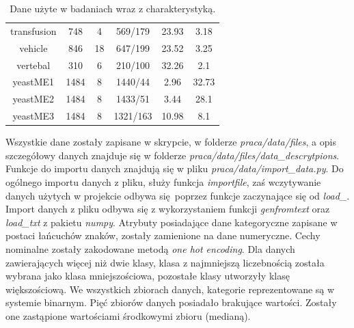 \begin{table}[H]
\begin{center}
{\begin{tabular}{|c|c|c|c|c|c|}
				transfusion&748&4&569/179&23.93&3.18\\%
				vehicle&846&18&647/199&23.52&3.25\\%
				vertebal&310&6&210/100&32.26&2.1\\%
				yeastME1&1484&8&1440/44&2.96&32.73\\%
				yeastME2&1484&8&1433/51&3.44&28.1\\%
				yeastME3&1484&8&1321/163&10.98&8.1\\%
				\hline%
			\end{tabular}}
			\caption{Dane użyte w badaniach wraz z charakterystyką.}
			\label{danebadania}
		\end{center}
	\end{table}
Wszystkie dane zostały zapisane w skrypcie, w folderze \textit{praca/data/files}, a opis szczegółowy danych znajduje się w folderze \textit{praca/data/files/data\_descrytpions}. Funkcje do importu danych znajdują się w pliku \textit{praca/data/import\_data.py}. Do ogólnego importu danych z pliku, służy funkcja \textit{importfile}, zaś wczytywanie danych użytych w projekcie odbywa się poprzez funkcje zaczynające się od \textit{load\_}. Import danych z pliku odbywa się z wykorzystaniem funkcji \textit{genfromtext} oraz \textit{load\_txt} z pakietu \textit{numpy}. Atrybuty posiadające dane kategoryczne zapisane w postaci łańcuchów znaków, zostały zamienione na dane numeryczne. Cechy nominalne zostały zakodowane metodą \textit{one hot encoding}. Dla danych zawierających więcej niż dwie klasy, klasa z najmniejszą liczebnością została wybrana jako klasa mniejszościowa, pozostałe klasy utworzyły klasę większościową. We wszystkich zbiorach danych, kategorie reprezentowane są w systemie binarnym. Pięć zbiorów danych posiadało brakujące wartości. Zostały one zastąpione wartościami środkowymi zbioru (medianą).

